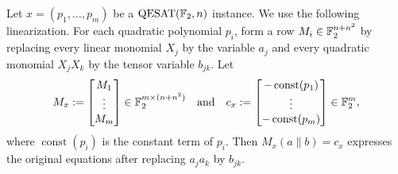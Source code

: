 


Let \(x=(p_1,\dots,p_m)\) be a \(\mathrm{QESAT}(\mathbb{F}_2,n)\) instance. We use the following
linearization. For each quadratic
polynomial \(p_i\), form a row \(M_i\in\mathbb{F}_2^{n+n^2}\) by replacing every
linear monomial \(X_j\) by the variable \(a_j\) and every quadratic monomial
\(X_jX_k\) by the tensor variable \(b_{jk}\). Let
    \[
    M_{x} := \begin{bmatrix} M_1 \\ \vdots \\ M_m \end{bmatrix} \in \mathbb{F}_2^{m \times (n+n^2)} 
    \quad \text{and} \quad 
    c_{x} := \begin{bmatrix} -\operatorname{const}(p_1) \\ \vdots \\ -\operatorname{const}(p_m) \end{bmatrix} \in \mathbb{F}_2^m,
    \]
where \(\operatorname{const}(p_i)\) is the constant term of \(p_i\).
Then \(M_{x}(a\parallel b)=c_{x}\) expresses the original equations after
replacing \(a_ja_k\) by \(b_{jk}\).

